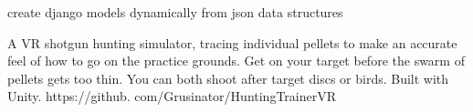 create django models dynamically from json data structures
\divider

    A VR shotgun hunting simulator, tracing individual pellets to make an accurate feel of how to go on the practice grounds.
 Get on your target before the swarm of pellets gets too thin.
 You can both shoot after target discs or birds.
 Built with Unity.
 https://github.
com/Grusinator/HuntingTrainerVR
      
